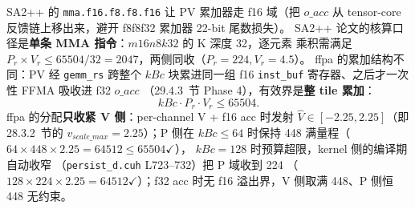 SA2++ 的 \texttt{mma.f16.f8.f8.f16} 让 PV 累加器走 f16 域（把 $o\_acc$
从 tensor-core 反馈链上移出来，避开 f8f8f32 累加器 22-bit 尾数损失）。
SA2++ 论文的核算口径是\textbf{单条 MMA 指令}：$m16n8k32$ 的 K 深度 32，逐元素
乘积需满足 $P_r\times V_r\le65504/32=2047$，两侧同收（$P_r=224,V_r=4.5$）。
ffpa 的累加结构不同：PV 经 \texttt{gemm\_rs} 跨整个 $kBc$ 块累进同一组 f16
\texttt{inst\_buf} 寄存器、之后才一次性 FFMA 吸收进 f32 $o\_acc$
（29.4.3~节 Phase 4），有效界是\textbf{整 tile 累加}：
\begin{equation}
  kBc\cdot P_r\cdot V_r \le 65504 .
  \label{eq:29-f16tile}
\end{equation}
ffpa 的分配\textbf{只收紧 V 侧}：per-channel V + f16 acc 时发射
$\hat V\in[-2.25,2.25]$（即 28.3.2~节的 $v_{scale\_max}=2.25$）；P 侧在
$kBc\le64$ 时保持 448 满量程（$64\times448\times2.25=64512\le65504$$\checkmark$），
$kBc=128$ 时预算超限，kernel 侧的编译期自动收窄
（\texttt{persist\_d.cuh} L723--732）把 P 域收到 224
（$128\times224\times2.25=64512$$\checkmark$）；f32 acc 时无 f16 溢出界，V 侧取满
448、P 侧恒 448 无约束。

